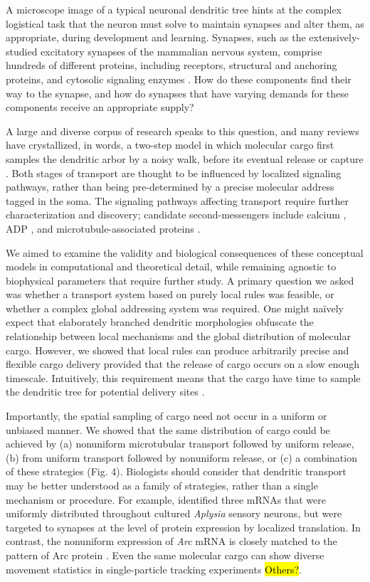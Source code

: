 \documentclass[11pt]{wlpeerj}
\begin{document}
A microscope image of a typical neuronal dendritic tree hints at the complex logistical task that the neuron must solve to maintain synapses and alter them, as appropriate, during development and learning.
Synapses, such as the extensively-studied excitatory synapses of the mammalian nervous system, comprise hundreds of different proteins, including receptors, structural and anchoring proteins, and cytosolic signaling enzymes \citep{Liu2014,Lassek2015}.
How do these components find their way to the synapse, and how do synapses that have varying demands for these components receive an appropriate supply?

A large and diverse corpus of research speaks to this question, and many reviews have crystallized, in words, a two-step model in which molecular cargo first samples the dendritic arbor by a noisy walk, before its eventual release or capture \citep{Welte2004,Doyle_2011,Buxbaum_2014b,Buxbaum2015}.
Both stages of transport are thought to be influenced by localized signaling pathways, rather than being pre-determined by a precise molecular address tagged in the soma.
The signaling pathways affecting transport require further characterization and discovery; candidate second-messengers include calcium \citep{Wang_2009}, ADP \citep{Mironov_2007}, and microtubule-associated proteins \citep{Soundararajan_2014}.

We aimed to examine the validity and biological consequences of these conceptual models in computational and theoretical detail, while remaining agnostic to biophysical parameters that require further study.
A primary question we asked was whether a transport system based on purely local rules was feasible, or whether a complex global addressing system was required.
One might na\"ively expect that elaborately branched dendritic morphologies obfuscate the relationship between local mechanisms and the global distribution of molecular cargo.
However, we showed that local rules can produce arbitrarily precise and flexible cargo delivery provided that the release of cargo occurs on a slow enough timescale.
Intuitively, this requirement means that the cargo have time to sample the dendritic tree for potential delivery sites \citep{Welte2004}.

Importantly, the spatial sampling of cargo need not occur in a uniform or unbiased manner. We showed that the same distribution of cargo could be achieved by (a) nonuniform microtubular transport followed by uniform release, (b) from uniform transport followed by nonuniform release, or (c) a combination of these strategies (Fig. 4).
Biologists should consider that dendritic transport may be better understood as a family of strategies, rather than a single mechanism or procedure.
For example, \cite{Kim_2015} identified three mRNAs that were uniformly distributed throughout cultured \textit{Aplysia} sensory neurons, but were targeted to synapses at the level of protein expression by localized translation.
In contrast, the nonuniform expression of \textit{Arc} mRNA is closely matched to the pattern of Arc protein \citep{Farris_2014, Steward_2015}.
Even the same molecular cargo can show diverse movement statistics in single-particle tracking experiments \citep{Dynes_2007} \hl{Others?}.
\end{document}
